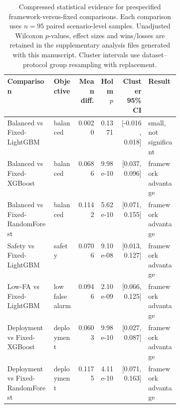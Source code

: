 \begin{table}[!htbp]
\centering
\scriptsize
\setlength{\tabcolsep}{4.5pt}
\renewcommand{\arraystretch}{1.08}
\caption{Compressed statistical evidence for prespecified framework-versus-fixed comparisons. Each comparison uses $n=95$ paired scenario-level samples. Unadjusted Wilcoxon $p$-values, effect sizes and wins/losses are retained in the supplementary analysis files generated with this manuscript. Cluster intervals use dataset--protocol group resampling with replacement.}
\label{tab:statistical-evidence}
\begin{tabularx}{\linewidth}{@{}>{\RaggedRight\arraybackslash}p{0.27\linewidth}>{\RaggedRight\arraybackslash}p{0.14\linewidth}r r r >{\RaggedRight\arraybackslash}X@{}}
\toprule
Comparison & Objective & Mean diff. & Holm $p$ & Cluster 95\% CI & Result \\
\midrule
Balanced vs Fixed-LightGBM & balanced & 0.0020 & 0.1371 & [-0.016, 0.018] & small, not significant \\
Balanced vs Fixed-XGBoost & balanced & 0.0686 & 9.98e-10 & [0.037, 0.096] & framework advantage \\
Balanced vs Fixed-RandomForest & balanced & 0.1142 & 5.62e-10 & [0.071, 0.155] & framework advantage \\
Safety vs Fixed-LightGBM & safety & 0.0706 & 9.10e-08 & [0.013, 0.127] & framework advantage \\
Low-FA vs Fixed-LightGBM & low false alarm & 0.0946 & 2.10e-09 & [0.066, 0.125] & framework advantage \\
Deployment vs Fixed-XGBoost & deployment & 0.0603 & 9.98e-10 & [0.027, 0.087] & framework advantage \\
Deployment vs Fixed-RandomForest & deployment & 0.1175 & 4.11e-10 & [0.071, 0.163] & framework advantage \\
\bottomrule
\end{tabularx}
\end{table}
